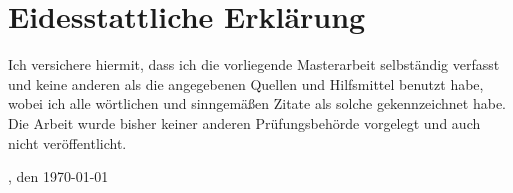 
\chapter*{Eidesstattliche Erklärung}

Ich versichere hiermit, dass ich die vorliegende Masterarbeit selbständig
verfasst und keine anderen als die angegebenen Quellen und Hilfsmittel benutzt
habe, wobei ich alle wörtlichen und sinngemäßen Zitate als solche gekennzeichnet
habe. Die Arbeit wurde bisher keiner anderen Prüfungsbehörde vorgelegt und auch
nicht veröffentlicht.\\[6ex]

\begin{flushright}
\ort, den \today

\color{jgu_hellgrau}\hdashrule[-0.5cm]{5cm}{0.5pt}{1pt}
\end{flushright}
